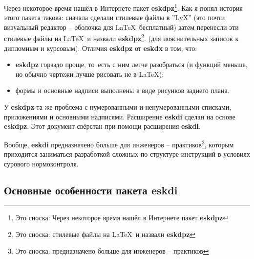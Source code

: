 Через некоторое время нашёл в Интернете пакет \textbf{eskdpz}\footnote{Это сноска: Через некоторое время нашёл в Интернете пакет \textbf{eskdpz}}. Как я понял история этого пакета такова: сначала сделали
стилевые файлы в ''LyX'' (это почти визуальный редактор – оболочка для \LaTeX\ бесплатный) затем перенесли эти стилевые файлы на \LaTeX\ и назвали \textbf{eskdpz}\footnote{Это сноска: стилевые файлы на \LaTeX\ и назвали \textbf{eskdpz}}. (для пояснительных записок к дипломным и курсовым). Отличия \textbf{eskdpz} от \textbf{eskdx} в том, что:
\begin{itemize}
  \item \textbf{eskdpz} гораздо проще, то~есть с ним легче разобраться (и функций меньше, но обычно чертежи лучше рисовать не в \LaTeX);
  \item формы и основные надписи выполнены в виде рисунков заднего плана.
\end{itemize}
У \textbf{eskdpz} та же проблема с нумерованными и ненумерованными списками, приложениями и основными надписями. Расширение \textbf{eskdi} сделан на основе \textbf{eskdpz}. Этот документ свёрстан при помощи расширения \textbf{eskdi}.

Вообще, \textbf{eskdi} предназначено больше для инженеров – практиков\footnote{Это сноска: предназначено больше для инженеров – практиков}, которым приходится заниматься разработкой сложных по структуре инструкций в условиях сурового нормоконтроля.




\subsection{Основные особенности пакета eskdi}

